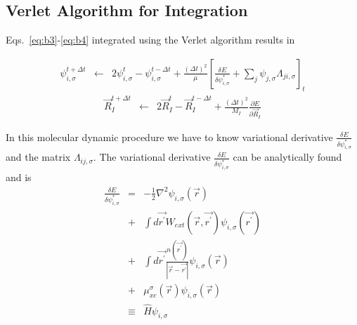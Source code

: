 \subsection{Verlet Algorithm for Integration}

Eqs.~\ref{eq:b3}-\ref{eq:b4} integrated using the Verlet algorithm
results in

\begin{eqnarray}
\psi_{i,\sigma}^{t+ \Delta t} 
                   &\leftarrow& 
                    2 \psi_{i,\sigma}^{t} - \psi_{i,\sigma}^{t-\Delta t}
                      + \frac{(\Delta t)^2}{\mu}
                        \left[ 
                           \frac{\delta E}{\delta \psi_{i,\sigma}^{*}}
                            + \sum_{j} \psi_{j,\sigma} \Lambda_{ji,\sigma} 
                        \right]_{t}
\label{eq:b6}
\end{eqnarray}
\begin{eqnarray}
\vec{R}_I^{t+\Delta t} &\leftarrow& 
                    2 \vec{R}_I^{t} - \vec{R}_I^{t-\Delta t}
                    + \frac{(\Delta t)^2}{M_I} 
                       \frac{\partial E}{\partial \vec{R}_I}
\label{eq:b7}
\end{eqnarray}
               
In this molecular dynamic procedure we have to know variational derivative
$\frac{\delta E}{\delta \psi_{i,\sigma}^{*}}$ and the matrix 
$\Lambda_{ij,\sigma}$. 
The variational derivative $\frac{\delta E}{\delta \psi_{i,\sigma}^{*}}$ 
can be analytically found and is
\begin{eqnarray}
\frac{\delta E}{\delta \psi_{i,\sigma}^{*}} 
      &=&  -\frac{1}{2} \nabla^2 
            \psi_{i,\sigma}(\vec{r}) \nonumber \\
      &+& \int d\vec{r^{\prime}} 
           W_{ext}(\vec{r},\vec{r^{\prime}}) 
          \psi_{i,\sigma}(\vec{r^{\prime}}) \nonumber \\
      &+& \int d\vec{r^{\prime}} 
                    \frac{n(\vec{r^{\prime}})}{|\vec{r}-\vec{r^{\prime}}|}
          \psi_{i,\sigma}(\vec{r}) \nonumber \\
      &+& \mu_{xc}^{\sigma}(\vec{r}) 
          \psi_{i,\sigma}(\vec{r}) \nonumber \\
& \equiv & \hat{H} \psi_{i,\sigma}
\label{eq:b8}
\end{eqnarray}
                        
